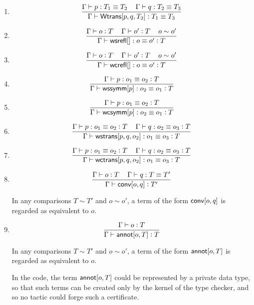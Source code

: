 \documentclass[11pt]{article}
\newcommand{\eqd}{\equiv}
\newcommand{\spc}{{\,\,\,\,\,\,\,}}
\newcommand{\ccheck}[1]{\vcentcolon#1}  %
\newcommand{\synth}[1]{\vcentcolon(\Rightarrow#1)} %
\renewcommand{\synth}[1]{\ccheck#1} %
\newcommand{\Type}{\mathop{\text{ \sc type}}}
\newcommand{\ha}[2]{#1[#2]}
\newcommand{\Wtrans}{{\sf Wtrans}}
\newcommand{\annot}{{\sf annot}}
\newcommand{\conv}{{\sf conv}}
\newcommand{\wsrefl}{{\sf wsrefl}}
\newcommand{\wcrefl}{{\sf wcrefl}}
\newcommand{\wssymm}{{\sf wssymm}}
\newcommand{\wcsymm}{{\sf wcsymm}}
\newcommand{\wstrans}{{\sf wstrans}}
\newcommand{\wctrans}{{\sf wctrans}}
\begin{document}
\begin{enumerate}
We don't list the sentences $ \Gamma \vdash T_1 \Type $ and $ \Gamma \vdash T_2
\Type $ as premisses, but for conversion to LF they would be needed, since each
item would have to be introduced somehow.  This might make this approach more
efficient than using LF.

\item 
$$\frac{\Gamma\vdash p:T_1\eqd T_2\spc\Gamma\vdash q:T_2\eqd T_3}{\Gamma\vdash \ha\Wtrans{p,q,T_2}: T_1\eqd T_3}$$

\item 
$$\frac{\Gamma\vdash o \synth{T}\spc\Gamma\vdash o' \synth{T} \spc o \sim o'}{\Gamma\vdash \ha\wsrefl{}:o\eqd o' \synth{T}}$$

\item 
$$\frac{\Gamma\vdash o \ccheck{T}\spc\Gamma\vdash o' \ccheck{T} \spc o \sim o'}{\Gamma\vdash \ha\wcrefl{}:o\eqd o' \ccheck{T}}$$

\item 
$$\frac{\Gamma\vdash p:o_1\eqd o_2 \synth{T}}{\Gamma\vdash \ha\wssymm{p}:o_2\eqd o_1 \synth{T}}$$

\item 
$$\frac{\Gamma\vdash p:o_1\eqd o_2 \ccheck{T}}{\Gamma\vdash \ha\wcsymm{p}:o_2\eqd o_1 \ccheck{T}}$$

\item 
$$\frac{\Gamma\vdash p:o_1\eqd o_2 \synth{T}\spc\Gamma\vdash q:o_2\eqd o_3 \synth{T}}{\Gamma\vdash \ha\wstrans{p,q,o_2}:o_1\eqd o_3 \synth{T}}$$

\item 
$$\frac{\Gamma\vdash p:o_1\eqd o_2 \ccheck{T}\spc\Gamma\vdash q:o_2\eqd o_3 \ccheck{T}}{\Gamma\vdash \ha\wctrans{p,q,o_2}:o_1\eqd o_3 \ccheck{T}}$$

\item 
$$\frac{\Gamma\vdash o \synth{T}\spc \Gamma\vdash q : T \eqd T'}{\Gamma\vdash \ha\conv{o,q} \ccheck{T'}}$$

In any comparisons $T\sim T'$ and $o\sim o'$, a term of the form
$\ha\conv{o,q}$ is regarded as equivalent to $o$.

\item 
$$\frac{\Gamma\vdash o \ccheck{T}}{\Gamma\vdash \ha\annot{o,T} \synth{T}}$$

In any comparisons $T\sim T'$ and $o\sim o'$, a term of the form
$\ha\annot{o,T}$ is regarded as equivalent to $o$.

In the code, the term $\ha\annot{o,T}$ could be represented by a private data
type, so that such terms can be created only by the kernel of the type checker,
and so no tactic could forge such a certificate.

\end{enumerate}
\end{document}
